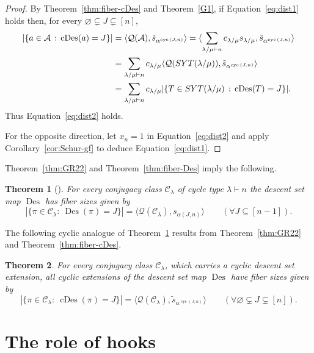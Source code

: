 \documentclass[10pt]{article}
\newtheorem{theorem}{Theorem}[section]
\theoremstyle{definition}
\newcommand{\Q}{\mathcal Q}
\newcommand{\C}{\mathcal C}
\newcommand{\A}{\mathcal A}
\DeclareMathOperator\Des{Des}
\DeclareMathOperator\cDes{cDes}
\DeclareMathOperator\cyc{cyc}
\newcommand\ccomp[2]{\alpha^{\cyc{(#2,#1)}}}
\newcommand{\cs}{\tilde s}
\def\SYT{{\rm SYT}}
\begin{document}
\begin{proof}
    By Theorem~\ref{thm:fiber-cDes} and Theorem~\ref{G1},
    if Equation~\eqref{eq:dist1} holds then,
    for every $\varnothing \subsetneq J \subsetneq [n]$,
    \begin{align*}
        |\{a \in \A \,:\, \cDes(a) = J\}| 
        &= \langle \Q(\A), \cs_{\ccomp{n}{J}} \rangle
        = \langle \sum\limits_{\lambda/\mu\vdash n} c_{\lambda/\mu} s_{\lambda/\mu}, \cs_{\ccomp{n}{J}} \rangle \\
        &= \sum\limits_{\lambda/\mu\vdash n} c_{\lambda/\mu} \langle \Q(\SYT(\lambda/\mu)), \cs_{\ccomp{n}{J}} \rangle \\
        &= \sum\limits_{\lambda/\mu\vdash n} c_{\lambda/\mu} |\{T \in \SYT(\lambda/\mu) \,:\, \cDes(T) =J\}|.
    \end{align*}
    Thus Equation~\eqref{eq:dist2} holds.

    For the opposite direction, let $x_n=1$ in Equation~\eqref{eq:dist2} and apply Corollary~\ref{cor:Schur-gf} to deduce  Equation~\eqref{eq:dist1}.
\end{proof}

Theorem~\ref{thm:GR22} and Theorem~\ref{thm:fiber-Des} imply the following. 

\begin{theorem}[{\cite[Theorem 2.1]{GR}}]\label{thm:GR}
    For every 
    conjugacy class $\C_\lambda$ of cycle type $\lambda \vdash n$ the
    descent set map $\Des$
    has fiber sizes given by
    \[
        |\{\pi \in \C_\lambda :\ 
        \Des(\pi)=J\}| = \langle \Q(\C_\lambda),  s_{\alpha(J,n)}\rangle
        \qquad (\forall J\subseteq [n-1]).
    \]
\end{theorem}

The following cyclic analogue of Theorem~\ref{thm:GR} results from Theorem~\ref{thm:GR22} and Theorem~\ref{thm:fiber-cDes}.
	
\begin{theorem}\label{thm:main22}
	For every conjugacy class $\C_\lambda$, which carries a cyclic descent set extension,
	all cyclic extensions of the descent set map $\Des$ 
	have fiber sizes given by
	\[
		|\{\pi\in \C_\lambda :\ \cDes(\pi)=J\}|=\langle \Q(\C_\lambda), \cs_{\ccomp{n}{J}} \rangle \qquad (\forall \varnothing \subsetneq J\subsetneq [n]).
	\]
\end{theorem}

		
\section{The role of hooks}\label{sec:hooks}
\end{document}
